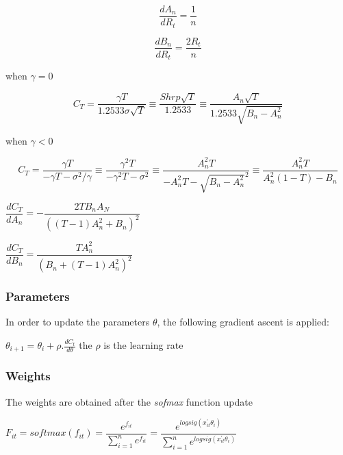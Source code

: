\documentclass[parskip=full]{scrartcl}
\begin{document}
$$ \dfrac{dA_n}{dR_t} = \dfrac{1}{n}$$

$$ \dfrac{dB_n}{dR_t} = \dfrac{2R_t}{n}$$

when  $ \gamma = 0 $

$$C_T  = \dfrac{\gamma T}{1.2533\sigma\sqrt{T}} \equiv \dfrac{Shrp\sqrt{T}}{1.2533} \equiv   \dfrac{A_n\sqrt{T}}{1.2533\sqrt{B_n - A_{n}^{2}}} $$

when  $ \gamma < 0$

$$C_T  = \dfrac{\gamma T}{-\gamma T - \sigma^2/\gamma} \equiv \dfrac{\gamma^2T}{-\gamma^2T - \sigma^2} \equiv   \dfrac{A_n^2T}{-A_n^2T-\sqrt{B_n - A_{n}^{2}}^2} \equiv \dfrac{A_n^2T}{A_n^2(1-T)-B_n}$$

$\dfrac{dC_T}{dA_n} =-\dfrac{2TB_nA_N}{\left(\left(T-1\right)A_{n}^{2}+B_n\right)^2}
$

$\dfrac{dC_T}{dB_n} =\dfrac{TA_{n}^{2}}{\left(B_n+\left(T-1\right)A_{n}^{2}\right)^2}
$

\subsubsection{Parameters}

In order to update the parameters $\theta$, the following gradient ascent is applied:


$ \theta_{i+1} = \theta_{i} + \rho.\frac{dC_t}{d\theta}$ the $\rho $ is the learning rate


\subsubsection{Weights}

The weights are obtained after the \textit{sofmax} function update

$F_{it} = softmax(f_{it}) = \dfrac{e^{f_{it}}}{\sum_{i=1}^{n}e^{f_{it}}} = \dfrac{e^{logsig(x_{it}^{'}\theta_{i})}}{\sum_{i=1}^{n}e^{logsig(x_{it}^{'}\theta_{i})}}$



\end{document}
